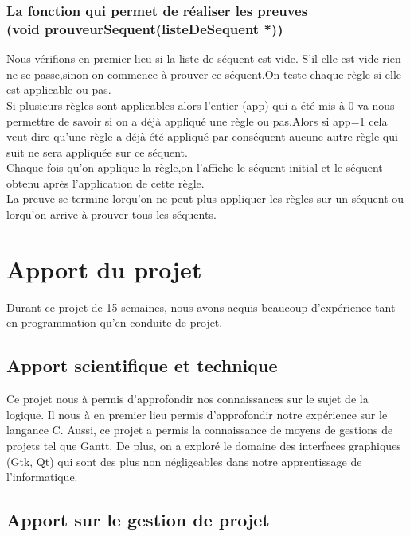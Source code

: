\documentclass[a4paper,12pt]{article}
\begin{document}
\subsubsection{La fonction qui permet de réaliser les preuves \\ (void prouveurSequent(listeDeSequent *))}

Nous vérifions en premier lieu si la liste de séquent est vide. S'il elle est vide rien ne se passe,sinon on commence 
à prouver ce séquent.On teste chaque règle si elle est applicable ou pas.\\
Si plusieurs règles sont applicables alors l'entier (app) qui a été mis à 0 va nous permettre de savoir si on a déjà appliqué
une règle ou pas.Alors si app=1 cela veut dire qu'une règle a déjà été appliqué par conséquent aucune autre règle qui suit ne sera appliquée sur ce séquent.\\
Chaque fois qu'on applique la règle,on l'affiche le séquent initial et le séquent obtenu après l'application de cette règle.\\
La preuve se termine lorqu'on ne peut plus appliquer les règles sur un séquent ou lorqu'on arrive à prouver tous les séquents.



\section{Apport du projet}

Durant ce projet de 15 semaines, nous avons acquis beaucoup d'expérience tant en programmation qu'en conduite de projet.                               

\subsection{Apport scientifique et technique}
Ce projet nous à permis d'approfondir nos connaissances sur le sujet de la logique. Il nous à en premier lieu permis d'approfondir notre expérience sur le langance C. Aussi, ce projet a permis la connaissance de moyens de gestions de  projets tel que Gantt. De plus, on a exploré le domaine des interfaces graphiques (Gtk, Qt) qui sont des plus non négligeables dans notre apprentissage de l'informatique.

\subsection{Apport sur le gestion de projet}
                                              
\end{document}
